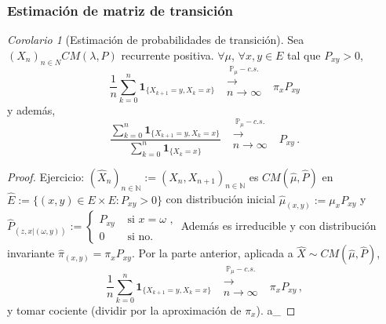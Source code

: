 \documentclass[letterpaper,11pt]{article} %
\theoremstyle{defbreak}
\theoremstyle{propbreak}
\theoremstyle{remark}
\theoremstyle{break}
\newtheorem{corolary}{Corolario}[subsection]
\def\P{\mathbb{P}}
\def\N{\mathbb{N}}
\def\ejercicio{\color{blue}Ejercicio\color{black}}
\def\gris{\color{mygray}}
\def\negro{\color{black}}
\def\findem{\null\hfill\color{white}a\color{black}_\square}
\def\xcm{(X_n)_{n\in N}}
\def\cm{CM(\lambda,P)}
\begin{document}
\subsubsection{Estimación de matriz de transición}
\begin{corolary}[Estimación de probabilidades de transición]
Sea $\xcm \cm$ recurrente positiva. $\forall \mu$, $\forall x,y\in E$ tal que $P_{xy}>0$,
$$ \displaystyle\frac{1}{n}\sum^n_{k=0}\mathbf{1}_{\{X_{k+1}=y,X_k=x\}} \mbox{ }\overset{\P_\mu-c.s.}{\substack{\longrightarrow \\n \to \infty}}\mbox{ }\pi_xP_{xy}$$
y además,
$$ \displaystyle \frac{\sum^n_{k=0}\mathbf{1}_{\{X_{k+1}=y,X_k=x\}}}{\sum^n_{k=0}\mathbf{1}_{\{X_{k}=x\}}}\mbox{ }\overset{\P_\mu-c.s.}{\substack{\longrightarrow \\n \to \infty}}\mbox{ }P_{xy}\,.$$
\end{corolary}
\begin{proof}
\ejercicio \gris: \newline $(\hat{X}_n)_{n\in\N}:=(X_n,X_{n+1})_{n\in\N}$ es $CM(\hat{\mu},\hat{P})$ en $\hat{E}:=\{(x,y)\in E\times E:P_{xy}>0\}$ con distribución inicial $\hat{\mu}_{(x,y)}:=\mu_xP_{xy}$ y $\hat{P}_{(z,x|(\omega,y))}:=\begin{cases}
P_{xy}
& \mbox{ si }x=\omega \mbox{ ,}\\
0 & \mbox{ si no.}
\end{cases}$ \newline Además es irreducible y con distribución invariante $\hat{\pi}_{(x,y)}=\pi_xP_{xy}$.
\newline Por la parte anterior, aplicada a $\hat{X}\sim CM(\hat{\mu},\hat{P})$,
$$ \displaystyle\frac{1}{n}\sum^n_{k=0}\mathbf{1}_{\{X_{k+1}=y,X_k=x\}} \mbox{ }\overset{\P_\mu-c.s.}{\substack{\longrightarrow \\n \to \infty}}\mbox{ }\pi_xP_{xy} \, ,$$ y tomar cociente (dividir por la aproximación de $\pi_x$). \negro \findem
\end{proof}
\end{document}
